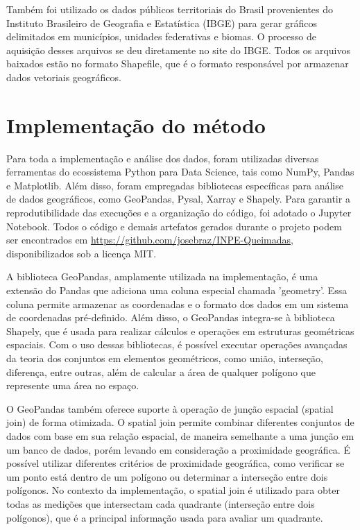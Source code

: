 \documentclass[cic,tc]{iiufrgs}
\begin{document}
Também foi utilizado os dados públicos territoriais do Brasil provenientes do Instituto Brasileiro de Geografia e Estatística (IBGE) para gerar gráficos delimitados em municípios, unidades federativas e biomas. O processo de aquisição desses arquivos se deu diretamente no site do IBGE. Todos os arquivos baixados estão no formato Shapefile, que é o formato responsável por armazenar dados vetoriais geográficos.


\section{Implementação do método}

Para toda a implementação e análise dos dados, foram utilizadas diversas ferramentas do ecossistema Python para Data Science, tais como NumPy, Pandas e Matplotlib. Além disso, foram empregadas bibliotecas específicas para análise de dados geográficos, como GeoPandas, Pysal, Xarray e Shapely. Para garantir a reprodutibilidade das execuções e a organização do código, foi adotado o Jupyter Notebook. Todos o código e demais artefatos gerados durante o projeto podem ser encontrados em \url{https://github.com/josebraz/INPE-Queimadas}, disponibilizados sob a licença MIT. \par

A biblioteca GeoPandas, amplamente utilizada na implementação, é uma extensão do Pandas que adiciona uma coluna especial chamada 'geometry'. Essa coluna permite armazenar as coordenadas e o formato dos dados em um sistema de coordenadas pré-definido. Além disso, o GeoPandas integra-se à biblioteca Shapely, que é usada para realizar cálculos e operações em estruturas geométricas espaciais. Com o uso dessas bibliotecas, é possível executar operações avançadas da teoria dos conjuntos em elementos geométricos, como união, interseção, diferença, entre outras, além de calcular a área de qualquer polígono que represente uma área no espaço. \par

O GeoPandas também oferece suporte à operação de junção espacial (spatial join) de forma otimizada. O spatial join permite combinar diferentes conjuntos de dados com base em sua relação espacial, de maneira semelhante a uma junção em um banco de dados, porém levando em consideração a proximidade geográfica. É possível utilizar diferentes critérios de proximidade geográfica, como verificar se um ponto está dentro de um polígono ou determinar a interseção entre dois polígonos. No contexto da implementação, o spatial join é utilizado para obter todas as medições que intersectam cada quadrante (interseção entre dois polígonos), que é a principal informação usada para avaliar um quadrante. \par
\end{document}
